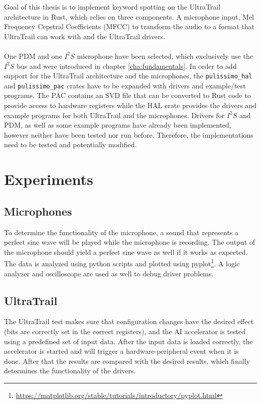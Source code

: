 
Goal of this thesis is to implement keyword spotting on the UltraTrail architecture in Rust,
which relies on three components.
A microphone input, Mel Frequency Cepstral Coefficients (MFCC) \cite[Cha 2.5]{rust_pulp} to transform the audio to
a format that UltraTrail can work with and the UltraTrail drivers.\\\\
One PDM and one $I^2S$ microphone have been selected, which exclusively use the $I^2S$ bus and were introduced
in chapter \ref{cha:fundamentals}.
In order to add support for the UltraTrail architecture and the microphones, the \lstinline{pulissimo_hal}
and \lstinline{pulissimo_pac} crates have to be expanded with drivers and example/test programs.
The PAC contains an SVD file that can be converted to Rust code to provide access to hardware registers
while the HAL crate provides the drivers and example programs for both UltraTrail and the microphones.
Drivers for $I^2S$ and PDM, as well as some example programs have already been implemented,
however neither have been tested nor run before.
Therefore, the implementations need to be tested and potentially modified.

\section{Experiments}

\subsection{Microphones}

To determine the functionality of the microphone, a sound that represents a perfect sine wave will be
played while the microphone is recording.
The output of the microphone should yield a perfect sine wave as well if it works as expected.\\
The data is analyzed using python scripts and plotted using pyplot\footnote{\url{https://matplotlib.org/stable/tutorials/introductory/pyplot.html}}.
A logic analyzer and oscilloscope are used as well to debug driver problems.

\subsection{UltraTrail}

The UltraTrail test makes sure that configuration changes have the desired effect (bits are correctly set in the correct registers),
and the AI accelerator is tested using a predefined set of input data.
After the input data is loaded correctly, the accelerator is started and will trigger a hardware-peripheral event when it is done.
After that the results are compared with the desired results, which finally determines the functionality of the drivers.
